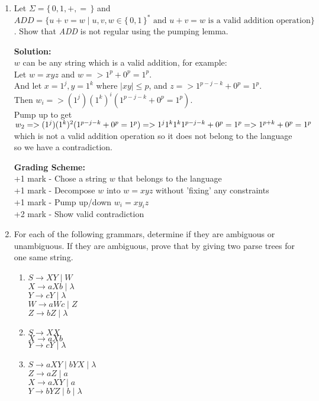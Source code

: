 \documentclass[11pt, article, oneside]{memoir}
\newcommand{\set}[1]{\{\, #1\, \}}
\begin{document}
\begin{enumerate}
    \item 
        Let \(\Sigma = \set{0, 1, +, =}\) and \(ADD = \{ u+v=w \mid u, v, w \in \set{0, 1}^* \text{ and } u+v=w \text{ is a valid addition operation}\}\). Show that \textit{ADD} is not regular using the pumping lemma.
        
        \textbf{Solution:}
        \\\(w\) can be any string which is a valid addition, for example:
        \\Let \(w = xyz\) and \(w => {1^p+0^p=1^p}\).
        \\And let \(x = 1^j, y = 1^k\) where \(|xy| \leq p\), and \(z => {1^{p - j - k}+0^p=1^p}\).
        \\Then \(w_i => {(1^j)(1^k)^i(1^{p - j - k}+0^p=1^p)}\).
        \\Pump up to get \(w_2 => {(1^j)(1^k)^2(1^{p - j - k}+0^p=1^p)}
        \\=> {1^j1^k1^k1^{p - j - k}+0^p=1^p}
        \\=> {1^{p+k}+0^p=1^p}\)
        \\which is not a valid addition operation so it does not belong to the language so we have a contradiction.

        \textbf{Grading Scheme:}
        \\+1 mark - Chose a string \(w\) that belongs to the language
        \\+1 mark - Decompose \(w\) into \(w = xyz\) without 'fixing' any constraints
        \\+1 mark - Pump up/down \(w_i = xy_iz\)
        \\+2 mark - Show valid contradiction
        
    \item
        For each of the following grammars, determine if they are ambiguous or unambiguous. If they are ambiguous, prove that by giving two parse trees for one same string.
        \begin{enumerate}
            \item
                \(S \rightarrow XY \mid W \)
                \\\(X \rightarrow aXb \mid \lambda\)
                \\\(Y \rightarrow cY \mid \lambda\)
                \\\(W \rightarrow aWc \mid Z\)
                \\\(Z \rightarrow bZ \mid \lambda\)
            \item
                \(S \rightarrow XX \)
                \\\(X \rightarrow aXb\)
                \\\(Y \rightarrow cY \mid \lambda\)
            \item
                \(S \rightarrow aXY \mid bYX \mid \lambda \)
                \\\(Z \rightarrow aZ \mid a\)
                \\\(X \rightarrow aXY \mid a\)
                \\\(Y \rightarrow bYZ \mid b \mid \lambda\) 
        \end{enumerate}


\end{enumerate}
\end{document}
